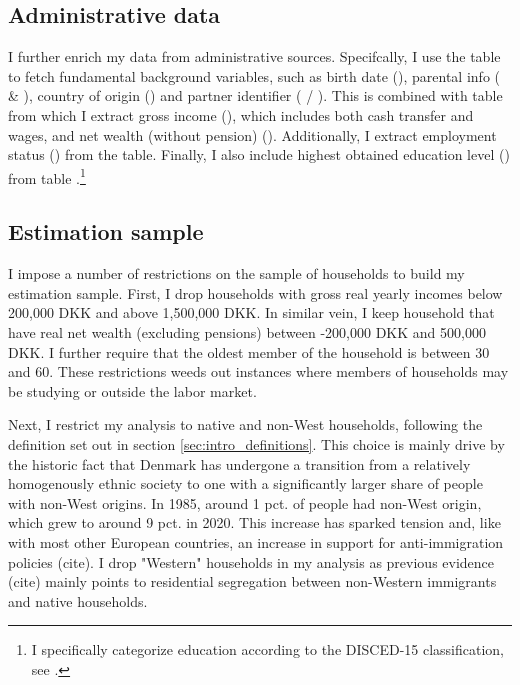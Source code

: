 \documentclass[main.tex]{subfiles}
\begin{document}
\subsection{Administrative data}
I further enrich my data from administrative sources. Specifcally, I use the table  to fetch fundamental background variables, such as birth date (), parental info ( \& ), country of origin () and partner identifier ( / ). This is combined with table  from which I extract gross income (), which includes both cash transfer and wages, and net wealth (without pension) (\textcolor{red}{}). Additionally, I extract employment status () from the  table. Finally, I also include highest obtained education level () from table .\footnote{I specifically categorize education according to the DISCED-15 classification, see \textcite{dst_disced_edu}.}

\subsection{Estimation sample}
\label{sec:estimation_sample_definition}
I impose a number of restrictions on the sample of households to build my estimation sample. First, I drop households with gross real yearly incomes below 200,000 DKK and above 1,500,000 DKK. In similar vein, I keep household that have real net wealth (excluding pensions) between -200,000 DKK and 500,000 DKK. I further require that the oldest member of the household is between 30 and 60. These restrictions weeds out instances where members of households may be studying or outside the labor market.  

Next, I restrict my analysis to native and non-West households, following the definition set out in section \ref{sec:intro_definitions}. This choice is mainly drive by the historic fact that Denmark has undergone a transition from a relatively homogenously ethnic society to one with a significantly larger share of people with non-West origins. In 1985, around 1 pct. of people had non-West origin, which grew to around 9 pct. in 2020. This increase has sparked tension and, like with most other European countries, an increase in support for anti-immigration policies (cite). I drop "Western" households in my analysis as previous evidence (cite) mainly points to residential segregation between non-Western immigrants and native households.
\end{document}
